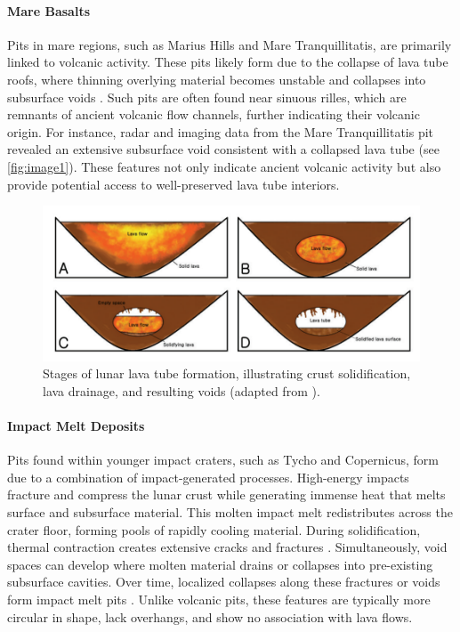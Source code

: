 \paragraph{Mare Basalts} Pits in mare regions, such as Marius Hills and Mare Tranquillitatis, are primarily linked to volcanic activity. These pits likely form due to the collapse of lava tube roofs, where thinning overlying material becomes unstable and collapses into subsurface voids \cite{lunar-pits-entrances-to-caves}. Such pits are often found near sinuous rilles, which are remnants of ancient volcanic flow channels, further indicating their volcanic origin. For instance, radar and imaging data from the Mare Tranquillitatis pit revealed an extensive subsurface void consistent with a collapsed lava tube \cite{Carrer2024, lava-tube-observations} (see \ref{fig:image1}). These features not only indicate ancient volcanic activity but also provide potential access to well-preserved lava tube interiors.

\begin{figure}[H]
    \centering
    \includegraphics[width=0.7\linewidth]{lava_tube_formation_schema.png}
    \caption{Stages of lunar lava tube formation, illustrating crust solidification, lava drainage, and resulting voids (adapted from \cite{lunar-pits-entrances-to-caves}).}
    \label{fig:lava-tube-formation-schema}
\end{figure}

\paragraph{Impact Melt Deposits} Pits found within younger impact craters, such as Tycho and Copernicus, form due to a combination of impact-generated processes. High-energy impacts fracture and compress the lunar crust while generating immense heat that melts surface and subsurface material. This molten impact melt redistributes across the crater floor, forming pools of rapidly cooling material. During solidification, thermal contraction creates extensive cracks and fractures \cite{new-wagner}. Simultaneously, void spaces can develop where molten material drains or collapses into pre-existing subsurface cavities. Over time, localized collapses along these fractures or voids form impact melt pits \cite{lunar-pits-numerical-modelling, lunar-pit-distribution}. Unlike volcanic pits, these features are typically more circular in shape, lack overhangs, and show no association with lava flows.

